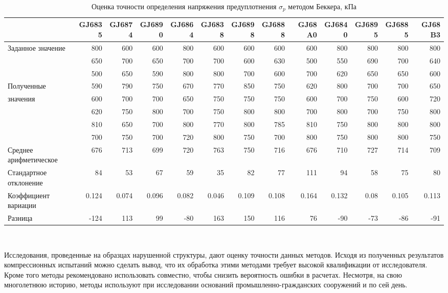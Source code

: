 \begin{sidewaystable}[p]
    \centering
    \small
    \caption{Оценка точности определения напряжения предуплотнения $\sigma_p$ методом Беккера, кПа} \label{tab:accuracy-beck}
    \begin{tabular}{@{}lrrrrrrrrrrrr@{}}
    \toprule
     & GJ6835 & GJ6874 & GJ6890 & GJ6864 & GJ6838 & GJ6898 & GJ6888 & GJ68A0 & GJ6840 & GJ6895 & GJ6885 & GJ68B3 \\
    \midrule
    Заданное значение & 800 & 600 & 600 & 800 & 600 & 600 & 600 & 600 & 800 & 800 & 800 & 800 \\
    \midrule
     & 650 & 700 & 650 & 700 & 700 & 600 & 630 & 500 & 550 & 690 & 700 & 640 \\
     & 500 & 650 & 590 & 800 & 800 & 700 & 600 & 700 & 620 & 650 & 650 & 600 \\
    Полученные & 590 & 790 & 750 & 670 & 770 & 850 & 750 & 620 & 800 & 700 & 700 & 650 \\
    значения & 600 & 700 & 700 & 650 & 750 & 750 & 750 & 600 & 700 & 750 & 600 & 720 \\
     & 620 & 750 & 800 & 700 & 750 & 800 & 800 & 700 & 800 & 700 & 750 & 800 \\
     & 810 & 650 & 700 & 800 & 770 & 800 & 785 & 810 & 750 & 800 & 800 & 800 \\
     & 700 & 750 & 700 & 720 & 800 & 750 & 700 & 800 & 750 & 800 & 800 & 750 \\
    \midrule
    Среднее арифметическое & 676 & 713 & 699 & 720 & 763 & 750 & 716 & 676 & 710 & 727 & 714 & 709 \\
    Стандартное отклонение & 84 & 53 & 67 & 59 & 35 & 82 & 77 & 111 & 94 & 58 & 75 & 80 \\
    Коэффициент вариации & 0.124 & 0.074 & 0.096 & 0.082 & 0.046 & 0.109 & 0.108 & 0.164 & 0.132 & 0.08 & 0.105 & 0.113 \\
    \midrule
    Разница & -124 & 113 & 99 & -80 & 163 & 150 & 116 & 76 & -90 & -73 & -86 & -91 \\
    \bottomrule
    \end{tabular}
    \\ 
\end{sidewaystable}


Исследования, проведенные на образцах нарушенной структуры, дают оценку точности данных методов. Исходя из полученных результатов компрессионных испытаний можно сделать вывод, что их обработка этими методами требует высокой квалификации от исследователя. Кроме того методы рекомендовано использовать совместно, чтобы снизить вероятность ошибки в расчетах. Несмотря, на свою многолетнюю историю, методы используют при исследовании оснований промышленно-гражданских сооружений и по сей день. 


